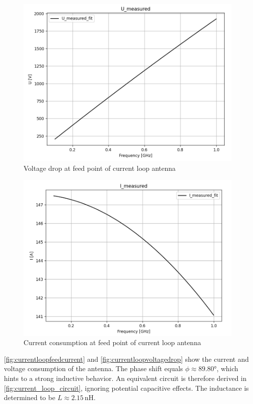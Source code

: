 
\begin{figure}[h]
	\centering
	\includegraphics[width=0.5\linewidth]{content/30_simulations/img/current_loop_voltage_drop}
	\caption{Voltage drop at feed point of current loop antenna}
	\label{fig:currentloopvoltagedrop}
\end{figure}

\begin{figure}[h]
	\centering
	\includegraphics[width=0.5\linewidth]{content/30_simulations/img/current_loop_feed_current}
	\caption{Current consumption at feed point of current loop antenna}
	\label{fig:currentloopfeedcurrent}
\end{figure}

\autoref{fig:currentloopfeedcurrent} and \autoref{fig:currentloopvoltagedrop} show the current and voltage consumption of the antenna. The phase shift equals $\phi\approx89.80°$, which hints to a strong inductive behavior. An equivalent circuit is therefore derived in \autoref{fig:current_loop_circuit}, ignoring potential capacitive effects. The inductance is determined to be $L\approx2.15\,\mathrm{nH}$. 

